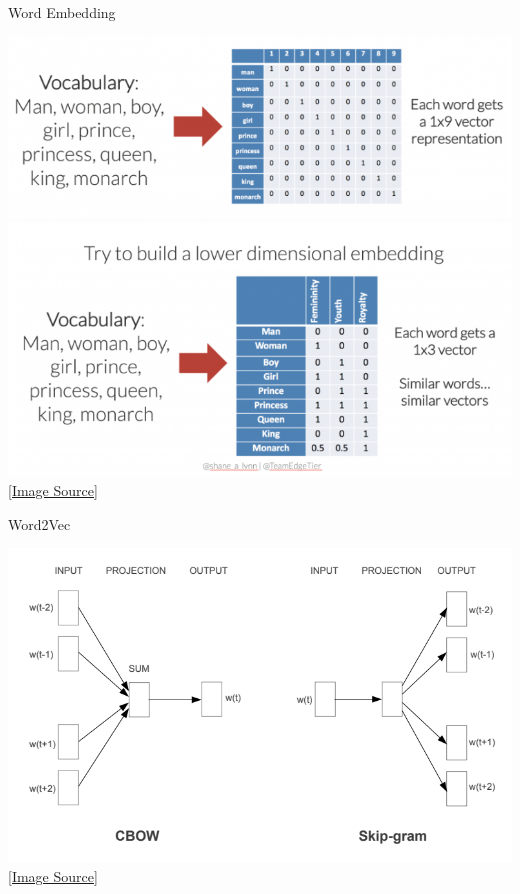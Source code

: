 \begin{frame}[fragile]{Word Embedding}

  \begin{center}
    \includegraphics[scale=0.3]{../images/img_2.png} \\
    \includegraphics[scale=0.3]{../images/img_3.png} \\
    \href{https://www.shanelynn.ie/get-busy-with-word-embeddings-introduction/}{[Image Source]}
  \end{center}

\end{frame}

\begin{frame}[fragile]{Word2Vec}

  \begin{center}
    \includegraphics[scale=0.3]{../images/img_4.png} \\
    \href{https://arxiv.org/pdf/1301.3781.pdf}{[Image Source]}
  \end{center}

\end{frame}

